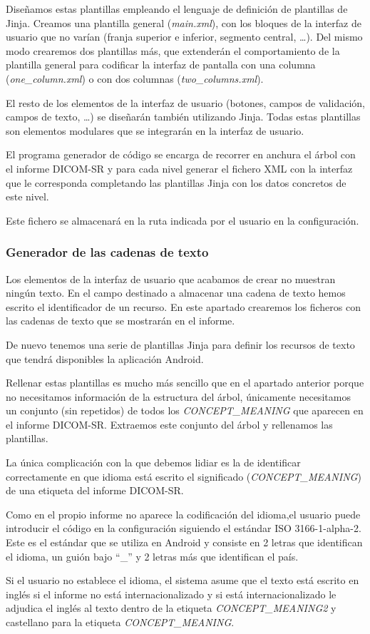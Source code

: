 Diseñamos estas plantillas empleando el lenguaje de definición de plantillas de Jinja. Creamos una plantilla general (\emph{main.xml}), con los bloques de la interfaz de usuario que no varían (franja superior e inferior, segmento central, \ldots). Del mismo modo crearemos dos plantillas más, que extenderán el comportamiento de la plantilla general para codificar la interfaz de pantalla con una columna (\emph{one\_column.xml}) o con dos columnas (\emph{two\_columns.xml}).\par
El resto de los elementos de la interfaz de usuario (botones, campos de validación, campos de texto, \ldots) se diseñarán también utilizando Jinja. Todas estas plantillas son elementos modulares que se integrarán en la interfaz de usuario.\medskip\par

El programa generador de código se encarga de recorrer en anchura el árbol con el informe DICOM-SR y para cada nivel generar el fichero XML con la interfaz que le corresponda completando las plantillas Jinja con los datos concretos de este nivel.\par
Este fichero se almacenará en la ruta indicada por el usuario en la configuración. \par


\subsubsection{Generador de las cadenas de texto}\label{vista:strings}
Los elementos de la interfaz de usuario que acabamos de crear no muestran ningún texto. En el campo destinado a almacenar una cadena de texto hemos escrito el identificador de un recurso. En este apartado crearemos los ficheros con las cadenas de texto que se mostrarán en el informe.\par
De nuevo tenemos una serie de plantillas Jinja para definir los recursos de texto que tendrá disponibles la aplicación Android.\par
Rellenar estas plantillas es mucho más sencillo que en el apartado anterior porque no necesitamos información de la estructura del árbol, únicamente necesitamos un conjunto (sin repetidos) de todos los \emph{CONCEPT\_MEANING} que aparecen en el informe DICOM-SR. Extraemos este conjunto del árbol y rellenamos las plantillas. \medskip\par
La única complicación con la que debemos lidiar es la de identificar correctamente en que idioma está escrito el significado (\emph{CONCEPT\_MEANING}) de una etiqueta del informe DICOM-SR.\par 
Como en el propio informe no aparece la codificación del idioma,el usuario puede introducir el código en la configuración siguiendo el estándar ISO 3166-1-alpha-2. Este es el estándar que se utiliza en Android y consiste en 2 letras que identifican el idioma, un guión bajo ``\_'' y 2 letras más que identifican el país.\par 
Si el usuario no establece el idioma, el sistema asume que el texto está escrito en inglés si el informe no está internacionalizado y si está internacionalizado le adjudica el inglés al texto dentro de la etiqueta   \emph{CONCEPT\_MEANING2} y castellano para la etiqueta  \emph{CONCEPT\_MEANING}.

